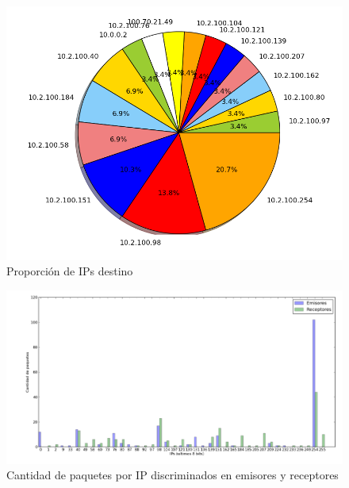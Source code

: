 \begin{figure}[!h]
  \includegraphics[width=\textwidth,keepaspectratio]{graph/receptores_facu.png}
  \caption{Proporción de IPs destino}
  \label{fig:torta-receptor-facu}
\end{figure}

\begin{figure}[!h]
  \includegraphics[width=\textwidth,keepaspectratio]{graph/barras-facu.png}
  \caption{Cantidad de paquetes por IP discriminados en emisores y receptores}
  \label{fig:barras-facu}
\end{figure}

